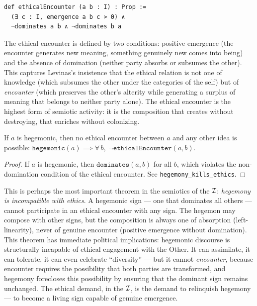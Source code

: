 \begin{lstlisting}[caption={Ethical encounter: emergence without domination}]
def ethicalEncounter (a b : I) : Prop :=
  (∃ c : I, emergence a b c > 0) ∧
  ¬dominates a b ∧ ¬dominates b a
\end{lstlisting}

\begin{interpretation}
The ethical encounter is defined by two conditions: positive emergence
(the encounter generates new meaning, something genuinely new comes
into being) and the absence of domination (neither party absorbs or
subsumes the other). This captures Levinas's insistence that the
ethical relation is not one of knowledge (which subsumes the other
under the categories of the self) but of \emph{encounter} (which
preserves the other's alterity while generating a surplus of meaning
that belongs to neither party alone). The ethical encounter is the
highest form of semiotic activity: it is the composition that creates
without destroying, that enriches without colonizing.
\end{interpretation}

\begin{theorem}
\label{thm:hegemony-kills-ethics}
If $a$ is hegemonic, then no ethical encounter between $a$ and any
other idea is possible:
$\texttt{hegemonic}(a) \implies \forall\, b,\;
\neg\texttt{ethicalEncounter}(a, b)$.
\end{theorem}

\begin{proof}
If $a$ is hegemonic, then $\texttt{dominates}(a, b)$ for all $b$, which
violates the non-domination condition of the ethical encounter. See
\texttt{hegemony\_kills\_ethics}.
\end{proof}

\begin{interpretation}
This is perhaps the most important theorem in the semiotics of the
$\mathcal{I}$: \emph{hegemony is incompatible with ethics}. A hegemonic sign
--- one that dominates all others --- cannot participate in an ethical
encounter with any sign. The hegemon may compose with other signs, but
the composition is always one of absorption (left-linearity), never
of genuine encounter (positive emergence without domination). This
theorem has immediate political implications: hegemonic discourse
is structurally incapable of ethical engagement with the Other.
It can assimilate, it can tolerate, it can even celebrate
``diversity'' --- but it cannot \emph{encounter}, because encounter
requires the possibility that both parties are transformed, and
hegemony forecloses this possibility by ensuring that the dominant
sign remains unchanged. The ethical demand, in the $\mathcal{I}$, is the
demand to relinquish hegemony --- to become a living sign capable
of genuine emergence.
\end{interpretation}

